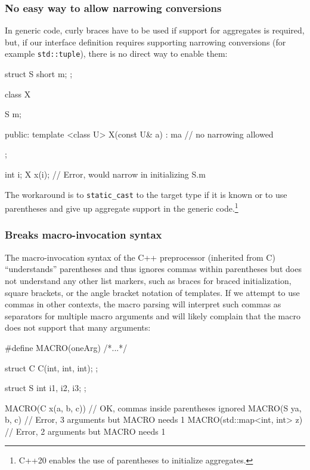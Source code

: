 \subsubsection[No easy way to allow narrowing conversions]{No easy way to allow narrowing conversions}\label{no-easy-way-to-allow-narrowing-conversions}

In generic code, curly braces have to be used if support for aggregates
is required, but, if our interface definition requires supporting
narrowing conversions (for example \lstinline!std::tuple!), there is no
direct way to enable them:

\begin{emcppslisting}
struct S
{
    short m;
};

class X
{
    S m;

public:
    template <class U>
    X(const U& a) : m{a}  // no narrowing allowed
    {
    }
};

int i;
X x(i);  // Error, would narrow in initializing S.m
\end{emcppslisting}
    

\noindent The workaround is to \lstinline!static_cast! to the target type if it is
known or to use parentheses and give up aggregate support in the generic
code.{\cprotect\footnote{C++20 enables the use of parentheses to
  initialize aggregates.}}

\subsubsection[Breaks macro-invocation syntax]{Breaks macro-invocation syntax}\label{breaks-macro-invocation-syntax}

The macro-invocation syntax of the C++ preprocessor (inherited from C)
``understands'' parentheses and thus ignores commas within parentheses
but does not understand any other list markers, such as braces for
braced initialization, square brackets, or the angle bracket notation of
templates. If we attempt to use commas in other contexts, the macro
parsing will interpret such commas as separators for multiple macro
arguments and will likely complain that the macro does not support that
many arguments:

\begin{emcppslisting}[emcppsbatch=e21]
#define MACRO(oneArg) /*...*/

struct C
{
    C(int, int, int);
};

struct S
{
    int i1, i2, i3;
};

MACRO(C x(a, b, c))         // OK, commas inside parentheses ignored
MACRO(S y{a, b, c})         // Error, 3 arguments but MACRO needs 1
MACRO(std::map<int, int> z) // Error, 2 arguments but MACRO needs 1
\end{emcppslisting}
    

